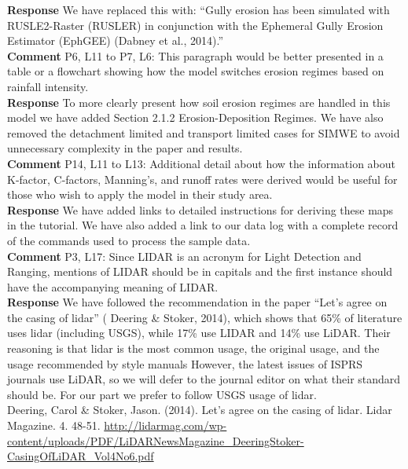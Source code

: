 \documentclass[gmd, manuscript]{copernicus}
\begin{document}
\noindent\textbf{Response}
We have replaced this with: ``Gully erosion has been simulated with RUSLE2-Raster (RUSLER) in conjunction with the Ephemeral Gully Erosion Estimator (EphGEE) (Dabney et al., 2014).''
\\

\noindent\textbf{Comment}
P6, L11 to P7, L6: This paragraph would be better presented in a table or a flowchart showing how the model switches erosion regimes based on rainfall intensity.
\\

\noindent\textbf{Response}
To more clearly present how  soil erosion regimes are handled in this model we have added Section 2.1.2 Erosion-Deposition Regimes. We have also removed the detachment limited and transport limited cases for SIMWE to avoid unnecessary complexity in the paper and results.
\\

\noindent\textbf{Comment}
P14, L11 to L13: Additional detail about how the information about K-factor, C-factors, Manning’s, and runoff rates were derived would be useful for those who wish to apply the model in their study area.
\\

\noindent\textbf{Response}
We have added links to detailed instructions for deriving these maps  in the tutorial. We have also added a link to our data log with a complete record of the commands used to process the sample data.
\\

\noindent\textbf{Comment}
P3, L17: Since LIDAR is an acronym for Light Detection and Ranging, mentions of LIDAR should be in capitals and the first instance should have the accompanying meaning of LIDAR.
\\

\noindent\textbf{Response}
We have followed the recommendation in the paper ``Let's agree on the casing of lidar'' ( Deering \& Stoker, 2014), which shows that 65\% of  literature uses lidar (including USGS), while 17\% use LIDAR and 14\% use LiDAR. Their reasoning is that lidar is the most common usage, the original usage, and the  usage recommended by style manuals  However, the latest issues of ISPRS journals use LiDAR, so we will defer to the journal editor on what their standard should be. For our part we prefer to follow USGS usage of lidar.\\

\noindent
Deering, Carol \& Stoker, Jason. (2014). Let's agree on the casing of lidar. Lidar Magazine. 4. 48-51. \url{http://lidarmag.com/wp-content/uploads/PDF/LiDARNewsMagazine_DeeringStoker-CasingOfLiDAR_Vol4No6.pdf}
\\
\end{document}
